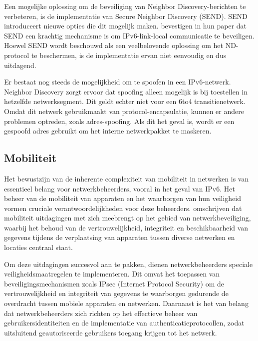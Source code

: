 Een mogelijke oplossing om de beveiliging van Neighbor Discovery-berichten te verbeteren, is de implementatie van Secure Neighbor Discovery (SEND). SEND introduceert nieuwe opties die dit mogelijk maken. \autocite{arkko2005secure} \textcite{7726976} bevestigen in hun paper dat SEND een krachtig mechanisme is om IPv6-link-local communicatie te beveiligen. Hoewel SEND wordt beschouwd als een veelbelovende oplossing om het ND-protocol te beschermen, is de implementatie ervan niet eenvoudig en dus uitdagend.
\newline

Er bestaat nog steeds de mogelijkheid om te spoofen in een IPv6-netwerk. \autocite{1333418} Neighbor Discovery zorgt ervoor dat spoofing alleen mogelijk is bij toestellen in hetzelfde netwerksegment. Dit geldt echter niet voor een 6to4 transitienetwerk. Omdat dit netwerk gebruikmaakt van protocol-encapsulatie, kunnen er andere problemen optreden, zoals adres-spoofing. Als dit het geval is, wordt er een gespoofd adres gebruikt om het interne netwerkpakket te maskeren. \autocite{1333418}

\subsection{Mobiliteit}


Het bewustzijn van de inherente complexiteit van mobiliteit in netwerken is van essentieel belang voor netwerkbeheerders, vooral in het geval van IPv6. Het beheer van de mobiliteit van apparaten en het waarborgen van hun veiligheid vormen cruciale verantwoordelijkheden voor deze beheerders. \textcite{aura2006designing} omschrijven dat mobiliteit uitdagingen met zich meebrengt op het gebied van netwerkbeveiliging, waarbij het behoud van de vertrouwelijkheid, integriteit en beschikbaarheid van gegevens tijdens de verplaatsing van apparaten tussen diverse netwerken en locaties centraal staat.
\newline

Om deze uitdagingen succesvol aan te pakken, dienen netwerkbeheerders speciale veiligheidsmaatregelen te implementeren. Dit omvat het toepassen van beveiligingsmechanismen zoals IPsec (Internet Protocol Security) om de vertrouwelijkheid en integriteit van gegevens te waarborgen gedurende de overdracht tussen mobiele apparaten en netwerken. Daarnaast is het van belang dat netwerkbeheerders zich richten op het effectieve beheer van gebruikersidentiteiten en de implementatie van authenticatieprotocollen, zodat uitsluitend geautoriseerde gebruikers toegang krijgen tot het netwerk.


